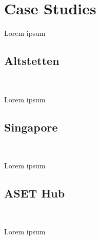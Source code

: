 \section{Case Studies}

Lorem ipsum

\subsection{Altstetten}\

Lorem ipsum

\subsection{Singapore}\

Lorem ipsum

\subsection{ASET Hub}\

Lorem ipsum